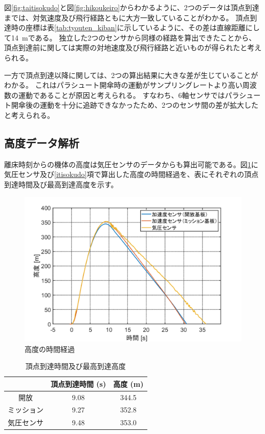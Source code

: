 \documentclass[a4paper,11pt,uplatex]{jsarticle}
\begin{document}
図\ref{fig:taitisokudo}と図\ref{fig:hikoukeiro}からわかるように、2つのデータは頂点到達までは、対気速度及び飛行経路ともに大方一致していることがわかる。
頂点到達時の座標は表\ref{tab:tyouten_kiban}に示しているように、その差は直線距離にして\SI{14}{m}である。
独立した2つのセンサから同様の経路を算出できたことから、頂点到達前に関しては実際の対地速度及び飛行経路と近いものが得られたと考えられる。

一方で頂点到達以降に関しては、2つの算出結果に大きな差が生じていることがわかる。
これはパラシュート開傘時の運動がサンプリングレートより高い周波数の運動であることが原因と考えられる。
すなわち、6軸センサではパラシュート開傘後の運動を十分に追跡できなかったため、2つのセンサ間の差が拡大したと考えられる。

\subsection{高度データ解析}
\label{koudo}
離床時刻からの機体の高度は気圧センサのデータからも算出可能である。図\ref{fig:koudozikannkeika}に気圧センサ及び\ref{itisokudo}項で算出した高度の時間経過を、表にそれぞれの頂点到達時間及び最高到達高度を示す。

\begin{figure}[H]
	\centering
	\includegraphics[width=0.7\linewidth]{pic_sim/pos_h.png}
	\caption{高度の時間経過}
	\label{fig:koudozikannkeika}
\end{figure}

\begin{table}[H]
	\centering
	\caption{頂点到達時間及び最高到達高度}
	\label{tab:tyouten}
	\begin{tabular}{ccc}
		\toprule
		      & 頂点到達時間 (\si{s}) & 高度 (\si{m}) \\ \midrule
		開放    & 9.08            & 344.5       \\
		ミッション & 9.27            & 352.8       \\
		気圧センサ & 9.48            & 353.0       \\
		\bottomrule
	\end{tabular}
\end{table}
\end{document}
